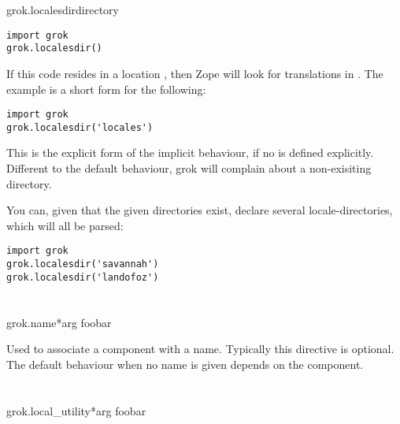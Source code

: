 \begin{funcdesc}{grok.localesdir}{directory}
          \begin{verbatim}
import grok
grok.localesdir()
          \end{verbatim}

          If this code resides in a location , then
          Zope will look for translations in . The
          example is a short form for the following:

          \begin{verbatim}
import grok
grok.localesdir('locales')
          \end{verbatim}

          This is the explicit form of the implicit behaviour, if no
           is defined explicitly. Different
          to the default behaviour, grok will complain about a
          non-exisiting  directory.

          You can, given that the given directories exist, declare
          several locale-directories, which will all be parsed:

          \begin{verbatim}
import grok
grok.localesdir('savannah')
grok.localesdir('landofoz')
          \end{verbatim}
         

        \end{funcdesc}

    \section{}

        \begin{funcdesc}{grok.name}{*arg}
        foobar
        \end{funcdesc}

        Used to associate a component with a name. Typically this directive is
        optional. The default behaviour when no name is given depends on the
        component.

    \section{}

        \begin{funcdesc}{grok.local_utility}{*arg}
        foobar
        \end{funcdesc}

    \section{}

